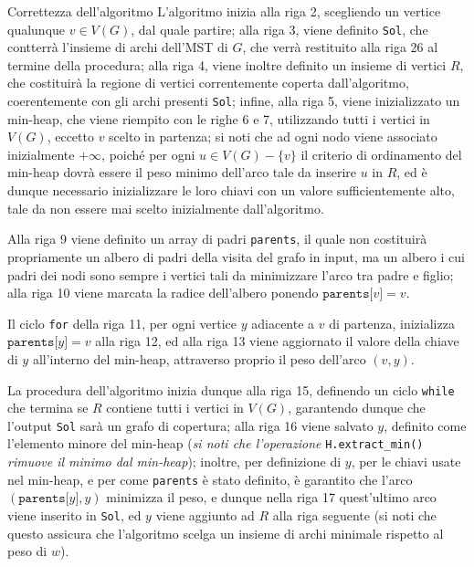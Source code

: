\documentclass[a4paper, 12pt]{report}
\begin{document}
    \begin{framedobs}{Correttezza dell'algoritmo}
        L'algoritmo inizia alla riga 2, scegliendo un vertice qualunque $v \in V(G)$, dal quale partire; alla riga 3, viene definito \texttt{Sol}, che contterrà l'insieme di archi dell'MST di $G$, che verrà restituito alla riga 26 al termine della procedura; alla riga 4, viene inoltre definito un insieme di vertici $R$, che costituirà la regione di vertici correntemente coperta dall'algoritmo, coerentemente con gli archi presenti \texttt{Sol}; infine, alla riga 5, viene inizializzato un min-heap, che viene riempito con le righe 6 e 7, utilizzando tutti i vertici in $V(G)$, eccetto $v$ scelto in partenza; si noti che ad ogni nodo viene associato inizialmente $+ \infty$, poiché per ogni $u \in V(G) - \{v\}$ il criterio di ordinamento del min-heap dovrà essere il peso minimo dell'arco tale da inserire $u$ in $R$, ed è dunque necessario inizializzare le loro chiavi con un valore sufficientemente alto, tale da non essere mai scelto inizialmente dall'algoritmo.

        Alla riga 9 viene definito un array di padri \texttt{parents}, il quale non costituirà propriamente un albero di padri della visita del grafo in input, ma un albero i cui padri dei nodi sono sempre i vertici tali da minimizzare l'arco tra padre e figlio; alla riga 10 viene marcata la radice dell'albero ponendo $\texttt{parents[}v\texttt{]} = v$.

        Il ciclo \texttt{for} della riga 11, per ogni vertice $y$ adiacente a $v$ di partenza, inizializza $\texttt{parents[}y\texttt{]} = v$ alla riga 12, ed alla riga 13 viene aggiornato il valore della chiave di $y$ all'interno del min-heap, attraverso proprio il peso dell'arco $(v, y)$.

        La procedura dell'algoritmo inizia dunque alla riga 15, definendo un ciclo \texttt{while} che termina se $R$ contiene tutti i vertici in $V(G)$, garantendo dunque che l'output \texttt{Sol} sarà un grafo di copertura; alla riga 16 viene salvato $y$, definito come l'elemento minore del min-heap (\textit{si noti che l'operazione} \texttt{H.extract\_min()} \textit{rimuove il minimo dal min-heap}); inoltre, per definizione di $y$, per le chiavi usate nel min-heap, e per come \texttt{parents} è stato definito, è garantito che l'arco $(\texttt{parents[}y\texttt{]}, y)$ minimizza il peso, e dunque nella riga 17 quest'ultimo arco viene inserito in \texttt{Sol}, ed $y$ viene aggiunto ad $R$ alla riga seguente (si noti che questo assicura che l'algoritmo scelga un insieme di archi minimale rispetto al peso di $w$).


\end{framedobs}
\end{document}
